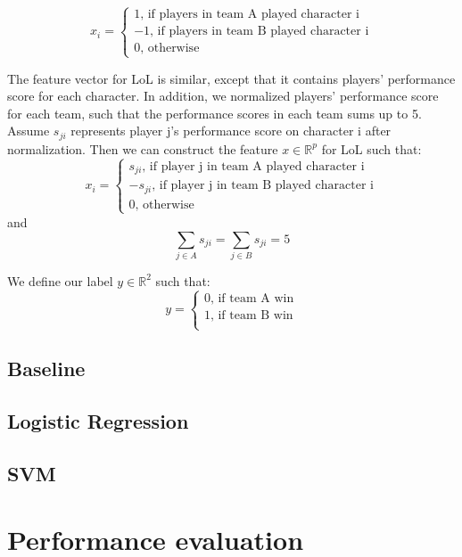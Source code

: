 \documentclass[conference]{IEEEtran}
\begin{document}
\begin{equation}
x_i = 
\begin{cases}
1 \text{, if players in team A played character i} \\
-1 \text{, if players in team B played character i} \\
0 \text{, otherwise}
\end{cases}
\end{equation}

The feature vector for LoL is similar, except that it contains players' performance score for each character. In addition, we normalized players' performance score for each team, such that the performance scores in each team sums up to 5. Assume $s_{ji}$ represents player j's performance score on character i after normalization. Then we can construct the feature $x \in \mathbb{R}^p$ for LoL such that:
\begin{equation}
x_i = 
\begin{cases}
s_{ji} \text{, if player j in team A played character i} \\
- s_{ji} \text{, if player j in team B played character i} \\
0 \text{, otherwise}
\end{cases}
\end{equation}
and
\[
\sum_{j \in A} s_{ji}= \sum_{j \in B} s_{ji}= 5
\]

We define our label $y \in \mathbb{R}^2$ such that:
\begin{equation}
y = 
\begin{cases}
0 \text{, if team A win} \\
1 \text{, if team B win} \\
\end{cases}
\end{equation}
\subsection{Baseline}

\subsection{Logistic Regression}

\subsection{SVM}


\section{Performance evaluation}
\end{document}

